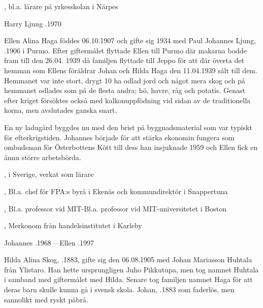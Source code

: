 \begin{jhchildren}
  \item {}
  \item {}, bl.a. lärare på yrkesskolan i Närpes
  \item {}
\end{jhchildren}

Harry Ljung .1970



Ellen Alina Haga föddes 06.10.1907 och gifte sig  1934 med Paul Johannes Ljung, .1906 i Purmo. Efter giftermålet flyttade Ellen till Purmo där makarna bodde fram till den 26.04. 1939 då familjen flyttade till Jeppo för att där överta det hemman som Ellens föräldrar Johan och Hilda Haga den 11.04.1939 sålt till dem. Hemmanet var inte stort, drygt 10 ha odlad jord och något mera skog och på hemmanet odlades som på de flesta andra; hö, havre, råg och potatis. Genast efter kriget försöktes också med kalkonuppfödning vid sidan av de traditionella korna, men avslutades ganska snart.


En ny ladugård byggdes nu med den brist på byggnadsmaterial som var typiskt för efterkrigstiden. Johannes började för att stärka ekonomin fungera som ombudsman för Österbottens Kött till dess han insjuknade 1959 och Ellen fick en ännu större arbetsbörda.

\begin{jhchildren}
  \item {}
  \item {}, i Sverige, verkat som lärare
  \item {}, Bl.a. chef för FPA:s byrå i Ekenäs och kommundirektör i Snappertuna
  \item {}, Bl.a. professor vid MIT-Bl.a. professor vid MIT-universitetet i Boston
  \item {}, Merkonom från handelsinstitutet i Karleby
\end{jhchildren}

Johannes .1968   --    Ellen .1997



Hilda Alina Skog, .1883, gifte sig den 06.08.1905 med Johan Mariasson Huhtala från Ylistaro. Han hette ursprungligen Juho Pikkutupa, men tog namnet Huhtala i samband med giftermålet med Hilda. Senare tog familjen namnet Haga för att deras barn skulle kunna gå i svensk skola. Johan, .1883 som faderlös, men sannolikt med ryskt påbrå.


